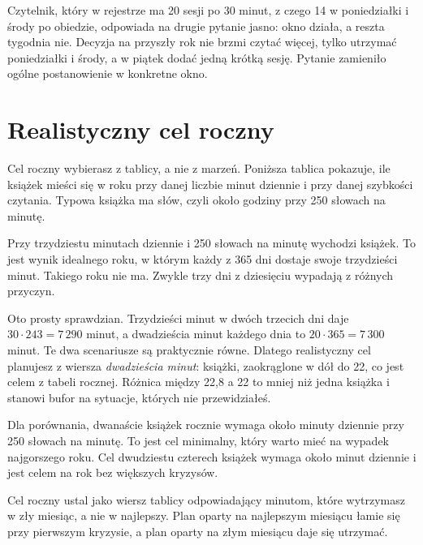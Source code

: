 \begin{przyklad}
Czytelnik, który w rejestrze ma 20 sesji po 30 minut, z czego 14 w poniedziałki i środy po obiedzie, odpowiada na drugie pytanie jasno: okno działa, a reszta tygodnia nie. Decyzja na przyszły rok nie brzmi \glqq czytać więcej\grqq{}, tylko \glqq utrzymać poniedziałki i środy, a w piątek dodać jedną krótką sesję\grqq{}. Pytanie zamieniło ogólne postanowienie w konkretne okno.
\end{przyklad}

\section{Realistyczny cel roczny}

Cel roczny wybierasz z tablicy, a nie z marzeń. Poniższa tablica pokazuje, ile książek mieści się w roku przy danej liczbie minut dziennie i przy danej szybkości czytania. Typowa książka ma  słów, czyli około  godziny przy 250 słowach na minutę.


Przy trzydziestu minutach dziennie i 250 słowach na minutę wychodzi  książek. To jest wynik idealnego roku, w którym każdy z 365 dni dostaje swoje trzydzieści minut. Takiego roku nie ma. Zwykle trzy dni z dziesięciu wypadają z różnych przyczyn.

Oto prosty sprawdzian. Trzydzieści minut w dwóch trzecich dni daje $30 \cdot 243 = 7\,290$ minut, a dwadzieścia minut każdego dnia to $20 \cdot 365 = 7\,300$ minut. Te dwa scenariusze są praktycznie równe. Dlatego realistyczny cel planujesz z wiersza \emph{dwadzieścia minut}:  książki, zaokrąglone w dół do 22, co jest celem z tabeli rocznej. Różnica między 22,8 a 22 to mniej niż jedna książka i stanowi bufor na sytuacje, których nie przewidziałeś.

Dla porównania, dwanaście książek rocznie wymaga około  minuty dziennie przy 250 słowach na minutę. To jest cel minimalny, który warto mieć na wypadek najgorszego roku. Cel dwudziestu czterech książek wymaga około  minut dziennie i jest celem na rok bez większych kryzysów.

\begin{zasada}
Cel roczny ustal jako wiersz tablicy odpowiadający minutom, które wytrzymasz w zły miesiąc, a nie w najlepszy. Plan oparty na najlepszym miesiącu łamie się przy pierwszym kryzysie, a plan oparty na złym miesiącu daje się utrzymać.
\end{zasada}

